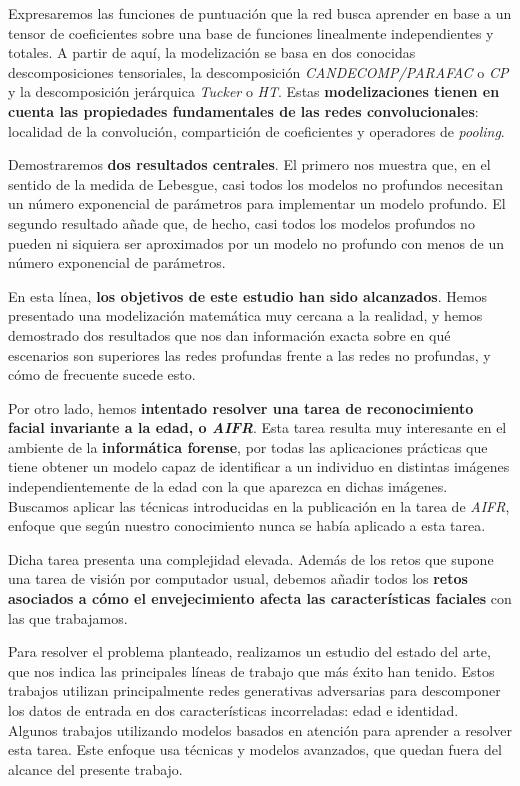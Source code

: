 Expresaremos las funciones de puntuación que la red busca aprender en base a un tensor de coeficientes sobre una base de funciones linealmente independientes y totales. A partir de aquí, la modelización se basa en dos conocidas descomposiciones tensoriales, la descomposición \textit{CANDECOMP/PARAFAC} o \textit{CP} y la descomposición jerárquica \textit{Tucker} o \textit{HT}. Estas \textbf{modelizaciones tienen en cuenta las propiedades fundamentales de las redes convolucionales}: localidad de la convolución, compartición de coeficientes y operadores de \textit{pooling}.

Demostraremos \textbf{dos resultados centrales}. El primero nos muestra que, en el sentido de la medida de Lebesgue, casi todos los modelos no profundos necesitan un número exponencial de parámetros para implementar un modelo profundo. El segundo resultado añade que, de hecho, casi todos los modelos profundos no pueden ni siquiera ser aproximados por un modelo no profundo con menos de un número exponencial de parámetros.

En esta línea, \textbf{los objetivos de este estudio han sido alcanzados}. Hemos presentado una modelización matemática muy cercana a la realidad, y hemos demostrado dos resultados que nos dan información exacta sobre en qué escenarios son superiores las redes profundas frente a las redes no profundas, y cómo de frecuente sucede esto.

Por otro lado, hemos \textbf{intentado resolver una tarea de reconocimiento facial invariante a la edad, o \textit{AIFR}}. Esta tarea resulta muy interesante en el ambiente de la \textbf{informática forense}, por todas las aplicaciones prácticas que tiene obtener un modelo capaz de identificar a un individuo en distintas imágenes independientemente de la edad con la que aparezca en dichas imágenes. Buscamos aplicar las técnicas introducidas en la publicación \cite{informatica:principal} en la tarea de \textit{AIFR}, enfoque que según nuestro conocimiento nunca se había aplicado a esta tarea.

Dicha tarea presenta una complejidad elevada. Además de los retos que supone una tarea de visión por computador usual, debemos añadir todos los \textbf{retos asociados a cómo el envejecimiento afecta las características faciales} con las que trabajamos.

Para resolver el problema planteado, realizamos un estudio del estado del arte, que nos indica las principales líneas de trabajo que más éxito han tenido. Estos trabajos utilizan principalmente redes generativas adversarias para descomponer los datos de entrada en dos características incorreladas: edad e identidad. Algunos trabajos utilizando modelos basados en atención para aprender a resolver esta tarea. Este enfoque usa técnicas y modelos avanzados, que quedan fuera del alcance del presente trabajo.

